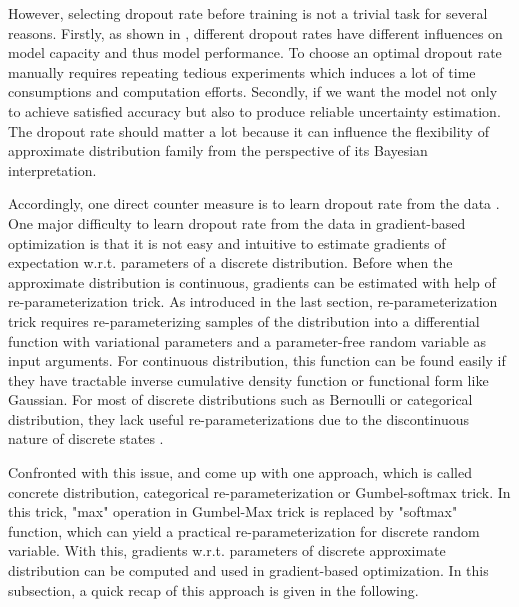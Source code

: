 However, selecting dropout rate before training is not a trivial task for several reasons. Firstly, as shown in \cite{srivastava2014dropout}, different dropout rates have different influences on model capacity and thus model performance. To choose an optimal dropout rate manually requires repeating tedious experiments which induces a lot of time consumptions and computation efforts. Secondly, if we want the model not only to achieve satisfied accuracy but also to produce reliable uncertainty estimation. The dropout rate should matter a lot because it can influence the flexibility of approximate distribution family from the perspective of its Bayesian interpretation.

Accordingly, one direct counter measure is to learn dropout rate from the data \cite{gal2017concrete}. One major difficulty to learn dropout rate from the data in gradient-based optimization is that it is not easy and intuitive to estimate gradients of expectation w.r.t. parameters of a discrete distribution. Before when the approximate distribution is continuous, gradients can be estimated with help of re-parameterization trick. As introduced in the last section, re-parameterization trick requires re-parameterizing samples of the distribution into a differential function with variational parameters and a parameter-free random variable as input arguments. For continuous distribution, this function can be found easily if they have tractable inverse cumulative density function or functional form like Gaussian\cite{kingma2013auto}. For most of discrete distributions such as Bernoulli or categorical distribution, they lack useful re-parameterizations due to the discontinuous nature of discrete states \cite{maddison2016concrete}. 

Confronted with this issue, \cite{jang2016categorical} and \cite{maddison2016concrete} come up with one approach, which is called concrete distribution, categorical re-parameterization or Gumbel-softmax trick. In this trick, "max" operation in Gumbel-Max trick is replaced by "softmax" function, which can yield a practical re-parameterization for discrete random variable. With this, gradients w.r.t. parameters of discrete approximate distribution can be computed and used in gradient-based optimization. In this subsection, a quick recap of this approach is given in the following.

